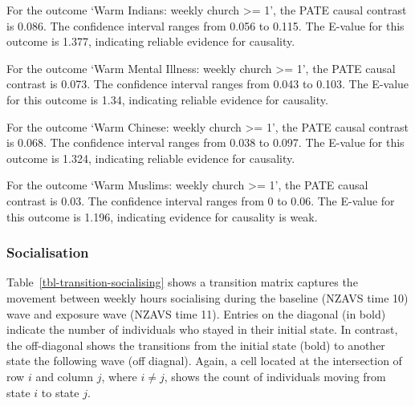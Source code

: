 \documentclass[
  singlecolumn]{article}
\begin{document}
For the outcome `Warm Indians: weekly church \textgreater= 1', the PATE
causal contrast is 0.086. The confidence interval ranges from 0.056 to
0.115. The E-value for this outcome is 1.377, indicating reliable
evidence for causality.

For the outcome `Warm Mental Illness: weekly church \textgreater= 1',
the PATE causal contrast is 0.073. The confidence interval ranges from
0.043 to 0.103. The E-value for this outcome is 1.34, indicating
reliable evidence for causality.

For the outcome `Warm Chinese: weekly church \textgreater= 1', the PATE
causal contrast is 0.068. The confidence interval ranges from 0.038 to
0.097. The E-value for this outcome is 1.324, indicating reliable
evidence for causality.

For the outcome `Warm Muslims: weekly church \textgreater= 1', the PATE
causal contrast is 0.03. The confidence interval ranges from 0 to 0.06.
The E-value for this outcome is 1.196, indicating evidence for causality
is weak.

\newpage{}

\subsubsection{Socialisation}\label{socialisation}

Table~\ref{tbl-transition-socialising} shows a transition matrix
captures the movement between weekly hours socialising during the
baseline (NZAVS time 10) wave and exposure wave (NZAVS time 11). Entries
on the diagonal (in bold) indicate the number of individuals who stayed
in their initial state. In contrast, the off-diagonal shows the
transitions from the initial state (bold) to another state the following
wave (off diagnal). Again, a cell located at the intersection of row
\(i\) and column \(j\), where \(i \neq j\), shows the count of
individuals moving from state \(i\) to state \(j\).
\end{document}
